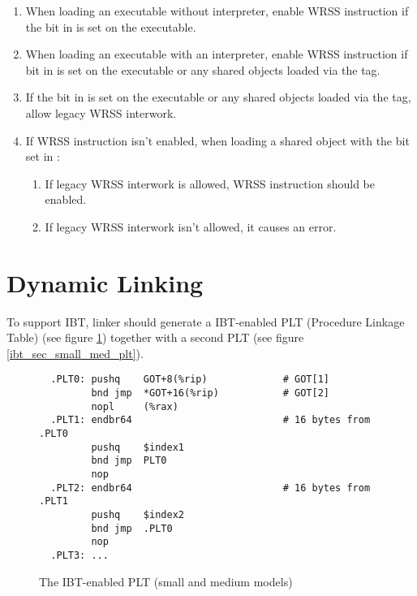 \begin{enumerate}
  \item
    \begin{sloppypar}
      When loading an executable without interpreter, enable WRSS
      instruction if the  bit in
       is set on the executable.
    \end{sloppypar}
  \item
    \begin{sloppypar}
      When loading an executable with an interpreter, enable WRSS
      instruction if  bit in
       is set on the executable
      or any shared objects loaded via the  tag.
    \end{sloppypar}
   \item If the  bit in
      is set on the
     executable or any shared objects loaded via the
      tag, allow legacy WRSS interwork.
  \item
    \begin{sloppypar}
      If WRSS instruction isn't enabled, when loading a shared
      object with the 
      bit set in :
    \end{sloppypar}
    \begin{enumerate}
      \item If legacy WRSS interwork is allowed, WRSS instruction
      should be enabled.
      \item If legacy WRSS interwork isn't allowed, it causes an error.
    \end{enumerate}
\end{enumerate}

\section{Dynamic Linking}

To support IBT, linker should generate a IBT-enabled PLT (Procedure
Linkage Table) (see figure \ref{ibt_small_med_plt}) together with a second
PLT (see figure \ref{ibt_sec_small_med_plt}).

\begin{figure}[H]
\Hrule
\caption{The IBT-enabled PLT (small and medium models)}
\label{ibt_small_med_plt}
\begin{footnotesize}
\begin{verbatim}
  .PLT0: pushq    GOT+8(%rip)             # GOT[1]
         bnd jmp  *GOT+16(%rip)           # GOT[2]
         nopl     (%rax)
  .PLT1: endbr64                          # 16 bytes from .PLT0
         pushq    $index1
         bnd jmp  PLT0
         nop
  .PLT2: endbr64                          # 16 bytes from .PLT1
         pushq    $index2
         bnd jmp  .PLT0
         nop
  .PLT3: ...
\end{verbatim}%
\end{footnotesize}
\Hrule
\end{figure}

